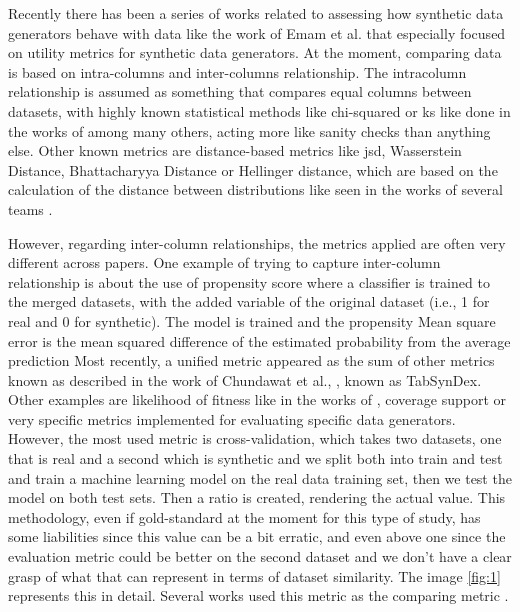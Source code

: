 
Recently there has been a series of works related to assessing how synthetic data generators behave with data like the work of Emam et al. \cite{emamUtilityMetricsEvaluating2022} that especially focused on utility metrics for synthetic data generators. At the moment, comparing data is based on intra-columns and inter-columns relationship. The intracolumn relationship is assumed as something that compares equal columns between datasets, with highly known statistical methods like chi-squared or \ac{ks} like done in the works of \cite{combrinkComparingSyntheticTabular2022} among many others, acting more like sanity checks than anything else. 
Other known metrics are distance-based metrics like \ac{jsd}, Wasserstein Distance, Bhattacharyya Distance or Hellinger distance, which are based on the calculation of the distance between distributions like seen in the works of several teams \cite{ISI:000557358500024,choiGeneratingMultilabelDiscrete2017,Baowaly2019}.

However, regarding inter-column relationships, the metrics applied are often very different across papers. One example of trying to capture inter-column relationship is about the use of propensity score \cite{rosenbaumCentralRolePropensity1983,mullerEvaluationSyntheticElectronic2022} where a classifier is trained to the merged datasets, with the added variable of the original dataset (i.e., 1 for real and 0 for synthetic). The model is trained and the propensity Mean square error is the  mean squared difference of the estimated probability from the average prediction
Most recently, a unified metric appeared as the sum of other metrics known as described in the work of Chundawat et al., \cite{chundawatTabSynDexUniversalMetric2022}, known as TabSynDex. Other examples are likelihood of fitness like in the works of \cite{xuModelingTabularData2019b}, coverage support \cite{goncalvesGenerationEvaluationSynthetic2020a} or very specific metrics implemented for evaluating specific data generators.
However, the most used metric is cross-validation, which takes two datasets, one that is real and a second which is synthetic and we split both into train and test and train a machine learning model on the real data training set, then we test the model on both test sets. Then a ratio is created, rendering the actual value. This methodology, even if gold-standard at the moment for this type of study, has some liabilities since this value can be a bit erratic, and even above one since the evaluation metric could be better on the second dataset and we don't have a clear grasp of what that can represent in terms of dataset similarity. The image \ref{fig:1} represents this in detail. Several works used this metric as the comparing metric \cite{mullerEvaluationSyntheticElectronic2022}.

